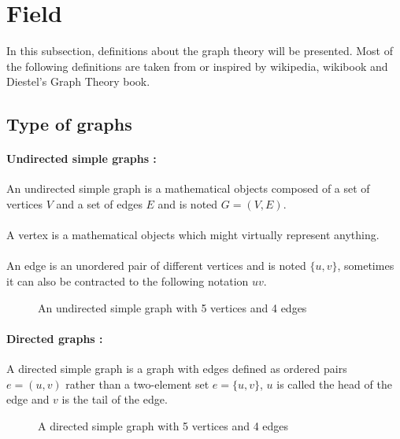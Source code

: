 \section{Field}
In this subsection, definitions about the graph theory will be presented. Most
of the following definitions are taken from or inspired by wikipedia,
wikibook and Diestel's Graph Theory book.

\subsection{Type of graphs}
\paragraph{Undirected simple graphs :}
An undirected simple graph is a mathematical objects composed of a set of
vertices $V$ and a set of edges $E$ and is noted $G = (V,E)$.

\paragraph{}
A vertex is a mathematical objects which might virtually represent anything.

\paragraph{}
An edge is an unordered pair of different vertices and is noted $\{u,v\}$,
sometimes it can also be contracted to the following notation $uv$.

\begin{figure}[!h]
  \begin{center}
    
  \end{center}
  \caption{An undirected simple graph with 5 vertices and 4 edges}
\end{figure}

\paragraph{Directed graphs :} 
A directed simple graph is a graph with edges defined as ordered pairs
$e = (u,v)$ rather than a two-element set $e = \{u,v\}$, $u$ is called the
head of the edge and $v$ is the tail of the edge.
\begin{figure}[!h]
  \begin{center}
    
  \end{center}
  \caption{A directed simple graph with 5 vertices and 4 edges}
\end{figure}

